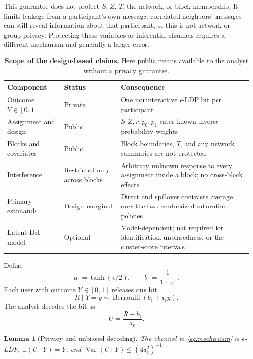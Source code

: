 \documentclass[10pt]{article}
\newtheorem{lemma}[theorem]{Lemma}
\theoremstyle{definition}
\theoremstyle{remark}
\newcommand{\E}{\mathbb{E}}
\newcommand{\Var}{\operatorname{Var}}
\newcommand{\doisig}{a_{\epsilon}}
\DeclareMathOperator{\Bern}{Bernoulli}
\begin{document}
This guarantee does not protect $S$, $Z$, $T$, the network, or block membership. It limits
leakage from a participant's own message; correlated neighbors' messages can still reveal
information about that participant, so this is not network or group privacy. Protecting those
variables or inferential channels requires a different mechanism and generally a larger error.

\begin{table}[htbp]
\centering
\caption{\textbf{Scope of the design-based claims.} Here public means available to the analyst
without a privacy guarantee.}
\label{tab:scope}
\small
\begin{tabular}{p{}p{}p{}}
\toprule
Component & Status & Consequence \\
\midrule
Outcome $Y\in[0,1]$ & Private & One noninteractive $\epsilon$-LDP bit per participant \\
Assignment and design & Public & $S,Z,r,p_0,p_1$ enter known inverse-probability weights \\
Blocks and covariates & Public & Block boundaries, $T$, and any network summaries are not protected \\
Interference & Restricted only across blocks & Arbitrary unknown response to every assignment
inside a block; no cross-block effects \\
Primary estimands & Design-marginal & Direct and spillover contrasts average over the two
randomized saturation policies \\
Latent DoI model & Optional & Model-dependent; not required for identification, unbiasedness,
or the cluster-score intervals \\
\bottomrule
\end{tabular}
\end{table}

Define
\[
  \doisig=\tanh(\epsilon/2),
  \qquad b_{\epsilon}=\frac{1}{1+e^{\epsilon}}.
\]
Each user with outcome $Y\in[0,1]$ releases one bit
\begin{equation}
  R\mid Y=y\sim\Bern\!\left(b_{\epsilon}+\doisig y\right).
  \label{eq:mechanism}
\end{equation}
The analyst decodes the bit as
\begin{equation}
  U=\frac{R-b_{\epsilon}}{\doisig}.
  \label{eq:decode}
\end{equation}

\begin{lemma}[Privacy and unbiased decoding]
\label{lem:mechanism}
The channel in \eqref{eq:mechanism} is $\epsilon$-LDP, $\E(U\mid Y)=Y$, and
$\Var(U\mid Y)\le (4\doisig^2)^{-1}$.
\end{lemma}
\end{document}
